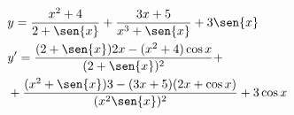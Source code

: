 \begin{ex}
\begin{align}
&y=\frac{x^2+4}{2+\sen{x}}+\frac{3x+5}{x^3+\sen{x}}+3\sen{x}\nonumber\\
&y'=\frac{(2+\sen{x})2x-(x^2+4)\cos{x}}{(2+\sen{x})^2}+\nonumber\\
&+\frac{(x^2+\sen{x})3-(3x+5)(2x+\cos{x})}{(x^2\sen{x})^2}+3\cos{x}\nonumber
\end{align}
\end{ex}